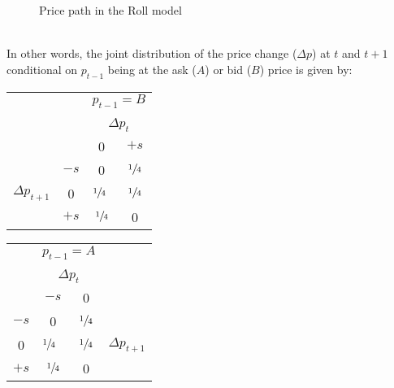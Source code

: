 \documentclass[12pt,twoside]{article}
\begin{document}
\begin{solution}
\begin{figure}[!htbp]
        \caption{Price path in the Roll model}
        \label{fig:roll_model}
    \end{figure}
    \\
    In other words, the joint distribution of the price change (\(\Delta p\)) at \(t\) and \(t+1\) conditional on \(p_{t-1}\) being at the ask (\(A\)) or bid (\(B\)) price is given by:
    \begin{table}[H]
        \centering
        \begingroup
        \color{nu purple}
        \begin{tabular}{cccc}
            & & \multicolumn{2}{c}{\(p_{t-1} = B\)} \\\\
            & & \multicolumn{2}{c}{\(\Delta p_{t}\)} \\
            & & 0 & \(+s\) \\ \cline{3-4} 
            & \multicolumn{1}{c|}{\(-s\)} & \multicolumn{1}{c|}{0}   & \multicolumn{1}{c|}{\(\sfrac{1}{4}\)} \\ \cline{3-4} 
    $\Delta p_{t+1}$ & \multicolumn{1}{c|}{0}  & \multicolumn{1}{l|}{\(\sfrac{1}{4}\)} & \multicolumn{1}{c|}{\(\sfrac{1}{4}\)} \\ \cline{3-4} 
            & \multicolumn{1}{c|}{\(+s\)} & \multicolumn{1}{c|}{\(\sfrac{1}{4}\)} & \multicolumn{1}{c|}{0}   \\ \cline{3-4} 
        \end{tabular}
        \qquad
        \begin{tabular}{cccc}
             & \multicolumn{2}{c}{\(p_{t-1} = A\)} & \\\\
             & \multicolumn{2}{c}{\(\Delta p_{t}\)} & \\
             & \(-s\) & 0 & \\ \cline{2-3} 
             \multicolumn{1}{c|}{\(-s\)} & \multicolumn{1}{c|}{0}   & \multicolumn{1}{c|}{\(\sfrac{1}{4}\)} & \\ \cline{2-3} 
      \multicolumn{1}{c|}{0}  & \multicolumn{1}{l|}{\(\sfrac{1}{4}\)} & \multicolumn{1}{c|}{\(\sfrac{1}{4}\)} & $\Delta p_{t+1}$ \\ \cline{2-3} 
             \multicolumn{1}{c|}{\(+s\)} & \multicolumn{1}{c|}{\(\sfrac{1}{4}\)} & \multicolumn{1}{c|}{0}  & \\ \cline{2-3} 
        \end{tabular}
        \endgroup
    \end{table}

\end{solution}
\end{document}

